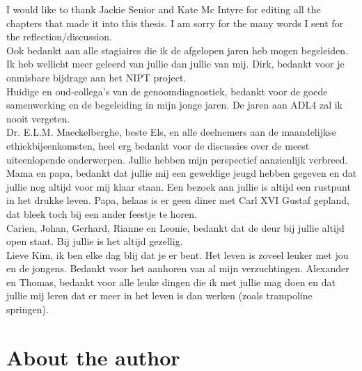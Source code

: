 \begin{appendices}
	\noindent I would like to thank Jackie Senior and Kate Mc Intyre for editing all the chapters that made it into this thesis. I am sorry for the many words I sent for the reflection/discussion.\\ 
	
	\noindent Ook bedankt aan alle stagiaires die ik de afgelopen jaren heb mogen begeleiden. Ik heb wellicht meer geleerd van jullie dan jullie van mij. Dirk, bedankt voor je onmisbare bijdrage aan het NIPT project.\\
	
	\noindent Huidige en oud-collega’s van de genoomdiagnostiek, bedankt voor de goede samenwerking en de begeleiding in mijn jonge jaren. De jaren aan ADL4 zal ik nooit vergeten.\\
	
	\noindent Dr. E.L.M. Maeckelberghe, beste Els, en alle deelnemers aan de maandelijkse ethiekbijeenkomsten, heel erg bedankt voor de discussies over de meest uiteenlopende onderwerpen.  Jullie hebben mijn perspectief aanzienlijk verbreed.\\
	
	\noindent Mama en papa, bedankt dat jullie mij een geweldige jeugd hebben gegeven en dat jullie nog altijd voor mij klaar staan. Een bezoek aan jullie is altijd een rustpunt in het drukke leven. Papa, helaas is er geen diner met Carl XVI Gustaf gepland, dat bleek toch bij een ander feestje te horen.\\
	
	\noindent Carien, Johan, Gerhard, Rianne en Leonie, bedankt dat de deur bij jullie altijd open staat. Bij jullie is het altijd gezellig.\\
	
	\noindent Lieve Kim, ik ben elke dag blij dat je er bent. Het leven is zoveel leuker met jou en de jongens. Bedankt voor het aanhoren van al mijn verzuchtingen. Alexander en Thomas, bedankt voor alle leuke dingen die ik met jullie mag doen en dat jullie mij leren dat er meer in het leven is dan werken (zoals trampoline springen). 
	
	\chapter{About the author}
	

\end{appendices}
